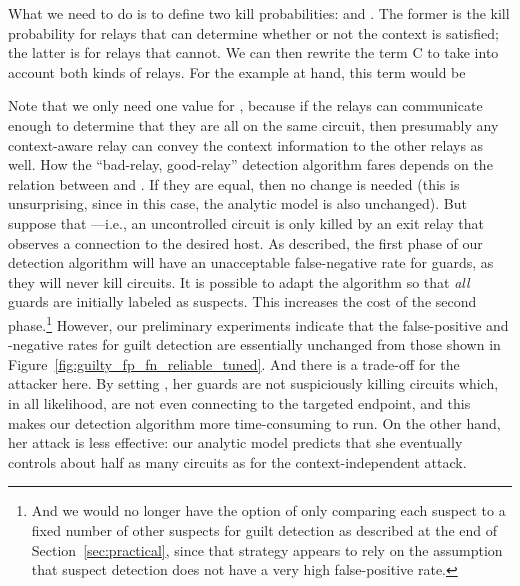 \documentclass[]{lmcs}
\begin{document}
What we need to do is to define two kill probabilities:
 and .
The former is the kill probability for relays that can determine whether or not
the context is satisfied; the latter is for relays that cannot.  We can then
rewrite the term C to
take into account both kinds of relays.  For the example at hand,
this term would be

Note that we only need one value for , because if the
relays can communicate enough to determine that they are all on the
same circuit, then presumably any context-aware relay can convey the
context information to the other relays as well.  How the
``bad-relay, good-relay'' detection algorithm fares depends on the
relation between  and
.  If they are equal, then no change is needed
(this is unsurprising, since in this case, the analytic model is also
unchanged).  But suppose that ---i.e.,
an uncontrolled
circuit is only killed by an exit relay that observes a connection
to the desired host.  As described, the first phase of our detection
algorithm will have an unacceptable false-negative rate for
guards, as they will never kill circuits.
It is possible to adapt the algorithm so that \emph{all} guards
are initially labeled as suspects.  This increases
the cost of the second phase.\footnote{And we would no longer have the
option of only comparing each suspect to a fixed number of other
suspects for guilt detection as described at the end of
Section~\ref{sec:practical}, since that strategy appears to rely on
the assumption that suspect detection does not have a very high
false-positive rate.}
However, our preliminary experiments indicate
that the false-positive and -negative rates for guilt detection are
essentially unchanged from those shown in 
Figure~\ref{fig:guilty_fp_fn_reliable_tuned}.
And there is a trade-off for the attacker
here.  By setting , her guards are
not suspiciously killing circuits which, in all likelihood, are not
even connecting to the targeted endpoint, and this makes our detection
algorithm more time-consuming to run.
On the other hand, her
attack is less effective:
our analytic model predicts that 
she eventually controls about half as many circuits as
for the context-independent attack.
\end{document}
